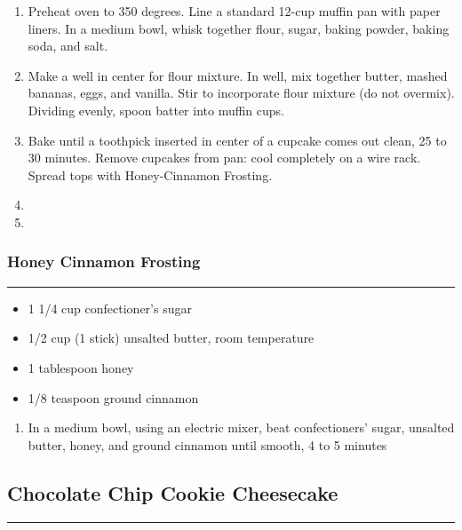 \documentclass{article}
\begin{document}
\begin{enumerate}
    \item 
        Preheat oven to 350 degrees. Line a standard 12-cup muffin pan with paper liners. In a medium bowl, whisk together flour, sugar, baking powder, baking soda, and salt.
    \item 
        Make a well in center for flour mixture. In well, mix together butter, mashed bananas, eggs, and vanilla. Stir to incorporate flour mixture (do not overmix). Dividing evenly, spoon batter into muffin cups.
    \item 
        Bake until a toothpick inserted in center of a cupcake comes out clean, 25 to 30 minutes. Remove cupcakes from pan: cool completely on a wire rack. Spread tops with Honey-Cinnamon Frosting.
    \item 
    \item 
\end{enumerate}

\subsubsection{Honey Cinnamon Frosting}
\noindent\rule[0.5ex]{\linewidth}{0.5pt}

\begin{framed}
    \begin{itemize}
        \item 1 1/4 cup confectioner's sugar 
        \item 1/2 cup (1 stick) unsalted butter, room temperature
        \item 1 tablespoon honey
        \item 1/8 teaspoon ground cinnamon
    \end{itemize}
\end{framed}

\begin{enumerate}
    \item 
        In a medium bowl, using an electric mixer, beat confectioners' sugar, unsalted butter, honey, and ground cinnamon until smooth, 4 to 5 minutes
\end{enumerate}
\newpage

\subsection{Chocolate Chip Cookie Cheesecake} 
\noindent\rule[0.5ex]{\linewidth}{1pt}
\end{document}
